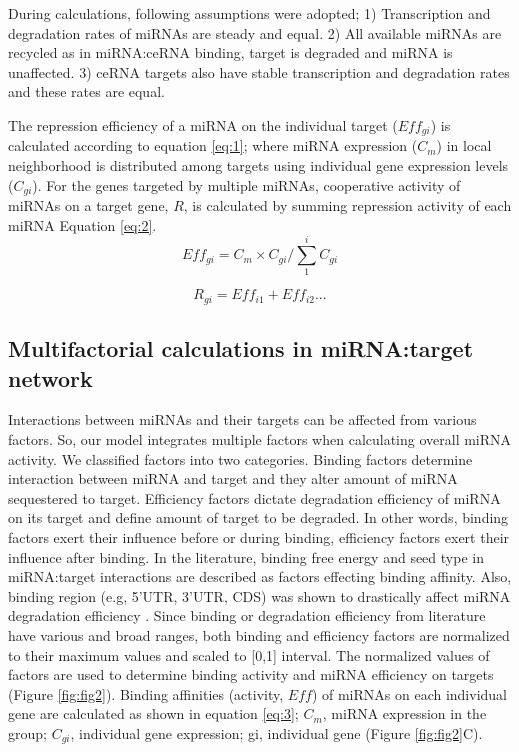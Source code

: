 \documentclass[a4,center,fleqn]{NAR}
\begin{document}
During calculations, following assumptions were adopted; 1)
Transcription and degradation rates of miRNAs are steady and equal. 2)
All available miRNAs are recycled as in miRNA:ceRNA binding, target is
degraded and miRNA is unaffected. 3) ceRNA targets also have stable
transcription and degradation rates and these rates are equal.

The repression efficiency of a miRNA on the individual target
(\(Eff_{gi}\)) is calculated according to equation \eqref{eq:1}; where
miRNA expression (\(C_m\)) in local neighborhood is distributed among
targets using individual gene expression levels (\(C_{gi}\)). For the
genes targeted by multiple miRNAs, cooperative activity of miRNAs on a
target gene, \(R\), is calculated by summing repression activity of each
miRNA Equation \eqref{eq:2}. \begin{equation*} 
    Eff_{gi}= C_m \times C_{gi}/\sum_{1}^{i} C_{gi} \tag{1}\label{eq:1}
\end{equation*}

\begin{equation*}
   R_{gi}= Eff_{i1} + Eff_{i2} ... \tag{2}\label{eq:2}
\end{equation*}

\subsection{Multifactorial calculations in miRNA:target network}

Interactions between miRNAs and their targets can be affected from
various factors. So, our model integrates multiple factors when
calculating overall miRNA activity. We classified factors into two
categories. Binding factors determine interaction between miRNA and
target and they alter amount of miRNA sequestered to target. Efficiency
factors dictate degradation efficiency of miRNA on its target and define
amount of target to be degraded. In other words, binding factors exert
their influence before or during binding, efficiency factors exert their
influence after binding. In the literature, binding free energy
\citetext{\citealp[
]{cao_predicting_2012}; \citealp{helwak_mapping_2013}} and seed type
\citep{werfel_preferential_2017} in miRNA:target interactions are
described as factors effecting binding affinity. Also, binding region
(e.g, 5'UTR, 3'UTR, CDS) was shown to drastically affect miRNA
degradation efficiency
\citep{hausser_analysis_2013, helwak_mapping_2013}. Since binding or
degradation efficiency from literature have various and broad ranges,
both binding and efficiency factors are normalized to their maximum
values and scaled to {[}0,1{]} interval. The normalized values of
factors are used to determine binding activity and miRNA efficiency on
targets (Figure \ref{fig:fig2}). Binding affinities (activity, \(Eff\))
of miRNAs on each individual gene are calculated as shown in equation
\eqref{eq:3}; \(C_m\), miRNA expression in the group; \(C_{gi}\),
individual gene expression; gi, individual gene (Figure
\ref{fig:fig2}C).
\end{document}
